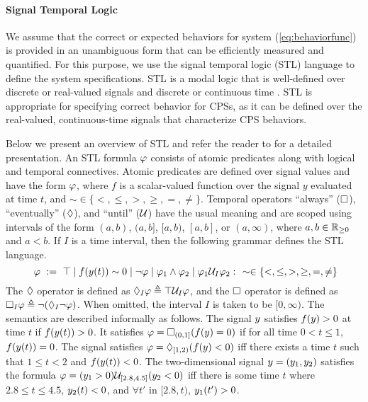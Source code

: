 \paragraph{Signal Temporal Logic} 

We assume that the correct or expected behaviors for system (\ref{eq:behaviorfunc}) is provided in an unambiguous form that can be efficiently measured and quantified. For this purpose, we use the signal temporal logic (STL) language to define the system specifications.
STL is a modal logic that is well-defined over discrete or real-valued signals and discrete or continuous time \cite{MalerN04}.
STL is appropriate for specifying correct behavior for CPSs, as it can be defined over the real-valued, continuous-time signals that characterize CPS behaviors.
  
Below we present an overview of STL and refer the reader to \cite{MalerN04} for a detailed presentation.
An STL formula $\varphi$ consists of atomic predicates along with logical and temporal connectives.
Atomic predicates are defined over signal values and have the form $\varphi$, where $f$ is a scalar-valued function over the signal $y$ evaluated at time $t$, and $\sim \in \{ <,\leq, >, \geq, =, \neq \}$.
Temporal operators ``always'' ($\Box$), ``eventually'' ($\Diamond$), and ``until'' ($\mathcal{U}$) have the usual meaning and are scoped using intervals of the form $(a,b)$, $(a,b]$, $[a,b)$, $[a,b]$, or $(a,\infty)$, where 
$a,b\in \mathbb{R}_{\geq 0}$ and $a<b$. If $I$ is a time interval, then the following grammar defines the STL language.
\begin{equation}~\label{eqn:stl-gen}
\varphi ~ := ~ \top \; | \; f(y(t))\sim 0 \; | \; \neg \varphi \; | \;
\varphi_1 \wedge \varphi_2 \; | \; \varphi_1 \mathcal{U}_I \varphi_2:~~\sim \in \{ <,\leq,>,\geq,=,\neq \}
\end{equation}
The $\Diamond$ operator is defined as $\Diamond_I \varphi \triangleq \top \mathcal{U}_I \varphi$, and the $\Box$ operator is defined as $\Box_I \varphi \triangleq \neg (\Diamond _I \neg \varphi)$. When omitted, the interval $I$ is taken  to be $[0,\infty)$. The semantics are described informally as follows. The signal $y$ satisfies $f(y)> 0$ at time $t$ if $f(y(t))>0$. It satisfies $\varphi = \Box_{(0,1]}(f(y)=0)$ if for all time $0< t \leq 1$, $f(y(t))=0$. The signal satisfies $\varphi= \Diamond_{[1,2)}(f(y)<0)$ iff there exists a time $t$ such that $1\leq t < 2$ and $f(y(t))<0$. The two-dimensional signal $y=(y_1,y_2)$ satisfies the formula $\varphi=(y_1>0)\mathcal{U}_{[2.8,4.5]}(y_2<0)$ iff there is some time $t$ where $2.8 \leq t \leq 4.5$, $y_2(t)<0$, and $\forall t'$ in $[2.8,t)$, $y_1(t')>0$. 

